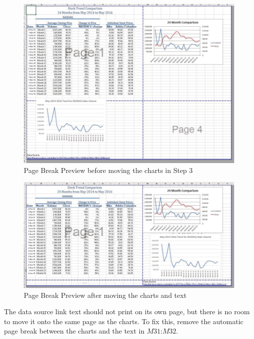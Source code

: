 \begin{figure}[H]
	\centering
	\includegraphics[width=\maxwidth{.95\linewidth}]{gfx/ch04_fig53}
	\caption{Page Break Preview before moving the charts in Step 3}
	\label{04:fig53}
\end{figure}

\begin{figure}[H]
	\centering
	\includegraphics[width=\maxwidth{.95\linewidth}]{gfx/ch04_fig54}
	\caption{Page Break Preview after moving the charts and text}
	\label{04:fig54}
\end{figure}

The data source link text should not print on its own page, but there is no room to move it onto the same page as the charts. To fix this, remove the automatic page break between the charts and the text in $ M31 $:$ M32 $.

